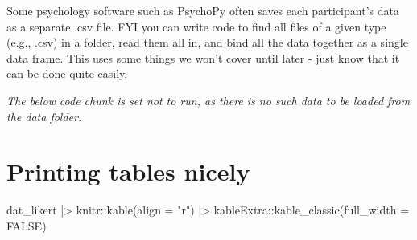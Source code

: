 \documentclass[
  letterpaper,
  DIV=11,
  numbers=noendperiod]{scrreprt}
\newenvironment{Shaded}{\begin{snugshade}}{\end{snugshade}}
\newcommand{\AttributeTok}[1]{\textcolor[rgb]{0.40,0.45,0.13}{#1}}
\newcommand{\CommentTok}[1]{\textcolor[rgb]{0.37,0.37,0.37}{#1}}
\newcommand{\ConstantTok}[1]{\textcolor[rgb]{0.56,0.35,0.01}{#1}}
\newcommand{\FunctionTok}[1]{\textcolor[rgb]{0.28,0.35,0.67}{#1}}
\newcommand{\NormalTok}[1]{\textcolor[rgb]{0.00,0.23,0.31}{#1}}
\newcommand{\OtherTok}[1]{\textcolor[rgb]{0.00,0.23,0.31}{#1}}
\newcommand{\SpecialCharTok}[1]{\textcolor[rgb]{0.37,0.37,0.37}{#1}}
\newcommand{\StringTok}[1]{\textcolor[rgb]{0.13,0.47,0.30}{#1}}
\begin{document}
Some psychology software such as PsychoPy often saves each participant's
data as a separate .csv file. FYI you can write code to find all files
of a given type (e.g., .csv) in a folder, read them all in, and bind all
the data together as a single data frame. This uses some things we won't
cover until later - just know that it can be done quite easily.

\emph{The below code chunk is set not to run, as there is no such data
to be loaded from the data folder.}

\begin{Shaded}
\end{Shaded}

\section{Printing tables nicely}\label{printing-tables-nicely}

\begin{Shaded}
\begin{Highlighting}[]
\NormalTok{dat\_likert }\SpecialCharTok{|\textgreater{}}
\NormalTok{  knitr}\SpecialCharTok{::}\FunctionTok{kable}\NormalTok{(}\AttributeTok{align =} \StringTok{"r"}\NormalTok{) }\SpecialCharTok{|\textgreater{}}
\NormalTok{  kableExtra}\SpecialCharTok{::}\FunctionTok{kable\_classic}\NormalTok{(}\AttributeTok{full\_width =} \ConstantTok{FALSE}\NormalTok{)}
\end{Highlighting}
\end{Shaded}
\end{document}
